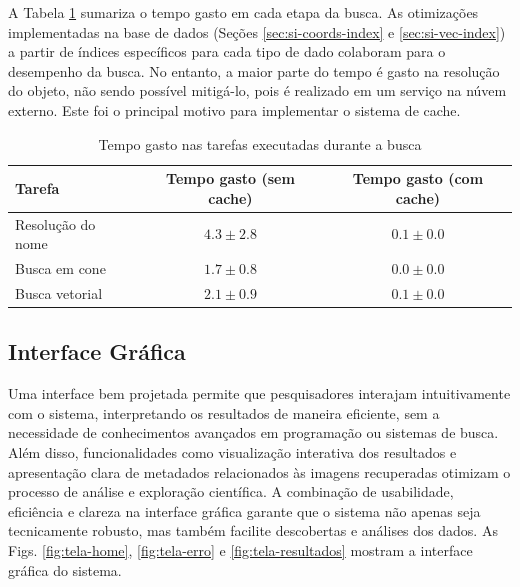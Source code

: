 A Tabela \ref{tab:times} sumariza o tempo gasto em cada etapa da busca. As otimizações implementadas na base de dados (Seções \ref{sec:si-coords-index} e \ref{sec:si-vec-index}) a partir de índices específicos para cada tipo de dado colaboram para o desempenho da busca. No entanto, a maior parte do tempo é gasto na resolução do objeto, não sendo possível mitigá-lo, pois é realizado em um serviço na núvem externo. Este foi o principal motivo para implementar o sistema de cache.


\begin{table}[!ht]
  \centering
  \caption{Tempo gasto nas tarefas executadas durante a busca}
  \label{tab:times}
  \begin{tabular}{lcc}
    \toprule
    Tarefa            & Tempo gasto (sem cache) & Tempo gasto (com cache) \\
    \midrule
    Resolução do nome & $4.3 \pm 2.8$           & $0.1 \pm 0.0$           \\
    Busca em cone     & $1.7 \pm 0.8$           & $0.0 \pm 0.0$           \\
    Busca vetorial    & $2.1 \pm 0.9$           & $0.1 \pm 0.0$           \\
    \bottomrule
  \end{tabular}
\end{table}



\subsection{Interface Gráfica}
\label{sec:sist-ui}

Uma interface bem projetada permite que pesquisadores interajam intuitivamente com o sistema, interpretando os resultados de maneira eficiente, sem a necessidade de conhecimentos avançados em programação ou sistemas de busca. Além disso, funcionalidades como visualização interativa dos resultados e apresentação clara de metadados relacionados às imagens recuperadas otimizam o processo de análise e exploração científica. A combinação de usabilidade, eficiência e clareza na interface gráfica garante que o sistema não apenas seja tecnicamente robusto, mas também facilite descobertas e análises dos dados. As Figs. \ref{fig:tela-home}, \ref{fig:tela-erro} e \ref{fig:tela-resultados} mostram a interface gráfica do sistema.

